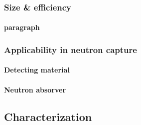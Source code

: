 \subsubsection{Size \& efficiency}

\paragraph{paragraph}

\subsubsection{Applicability in neutron capture}

\paragraph{Detecting material}

\paragraph{Neutron absorver}

\subsection{Characterization}
